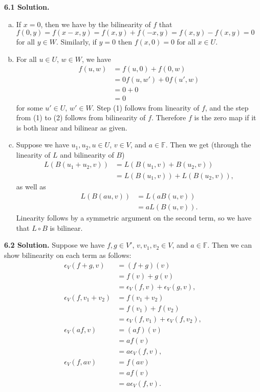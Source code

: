 \textbf{6.1 Solution.} \begin{enumerate}[(a)]
    \item If $x = 0$, then we have by the bilinearity of $f$ that $f(0, y) = f(x-x, y) = f(x, y) + f(-x, y) = f(x, y) - f(x, y) = 0$ for all $y \in W$. Similarly, if $y = 0$ then $f(x, 0) = 0$ for all $x \in U$.
    
    \item For all $u \in U$, $w \in W$, we have
    \begin{align}
        f(u, w) &= f(u, 0) + f(0, w) \\
                &= 0f(u, w') + 0f(u', w) \\
                &= \nonumber 0 + 0 \\
                &= \nonumber 0
    \end{align}
    for some $u' \in U$, $w' \in W$. Step (1) follows from linearity of $f$, and the step from (1) to (2) follows from bilinearity of $f$. Therefore $f$ is the zero map if it is both linear and bilinear as given.
    
    \item Suppose we have $u_1, u_2, u \in U$, $v \in V$, and $a \in \mathbb{F}$. Then we get (through the linearity of $L$ and bilinearity of $B$)
    \begin{align*}
        L(B(u_1 + u_2, v)) &= L(B(u_1, v) + B(u_2, v)) \\
            &= L(B(u_1, v)) + L(B(u_2, v)),
    \end{align*}
    as well as
    \begin{align*}
        L(B(au, v)) &= L(aB(u, v)) \\
            &= aL(B(u, v)).
    \end{align*}
    Linearity follows by a symmetric argument on the second term, so we have that $L \circ B$ is bilinear.
\end{enumerate}

\textbf{6.2 Solution.} Suppose we have $f, g \in V'$, $v, v_1, v_2 \in V$, and $a \in \mathbb{F}$. Then we can show bilinearity on each term as follows:
\begin{align*}
    \epsilon_V(f+g, v) &= (f+g)(v) \\
                       &= f(v) + g(v) \\
                       &= \epsilon_V(f, v) + \epsilon_V(g, v), \\
    \epsilon_V(f, v_1+v_2) &= f(v_1+v_2) \\
                           &= f(v_1) + f(v_2) \\
                           &= \epsilon_V(f, v_1) + \epsilon_V(f, v_2), \\
    \epsilon_V(af, v) &= (af)(v) \\
                      &= af(v) \\
                      &= a\epsilon_V(f, v), \\
    \epsilon_V(f, av) &= f(av) \\
                      &= af(v) \\
                      &= a\epsilon_V(f, v).
\end{align*}

